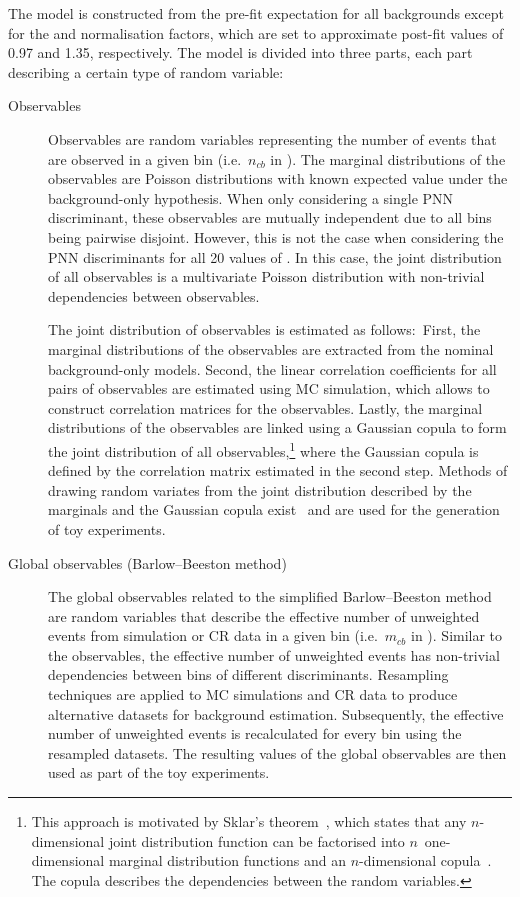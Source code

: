The model is constructed from the pre-fit expectation for all backgrounds except
for the \ttbar and \ZHF normalisation factors, which are set to approximate
post-fit values of 0.97 and 1.35, respectively. The model is divided into three
parts, each part describing a certain type of random variable:
\begin{description}

\item[Observables] Observables are random variables representing the number of
  events that are observed in a given bin (i.e.~$n_{cb}$ in
  ). The marginal distributions of the
  observables are Poisson distributions with known expected value under the
  background-only hypothesis. When only considering a single PNN discriminant,
  these observables are mutually independent due to all bins being pairwise
  disjoint. However, this is not the case when considering the PNN discriminants
  for all 20 values of \mX. In this case, the joint distribution of all
  observables is a multivariate Poisson distribution with non-trivial
  dependencies between observables.

  The joint distribution of observables is estimated as follows:~First, the
  marginal distributions of the observables are extracted from the nominal
  background-only models. Second, the linear correlation coefficients for all
  pairs of observables are estimated using MC simulation, which allows to
  construct correlation matrices for the observables. Lastly, the marginal
  distributions of the observables are linked using a Gaussian copula to form
  the joint distribution of all observables,\footnote{This approach is motivated
    by Sklar's theorem~\cite{Sklar1959FonctionsDR}, which states that any
    $n$-dimensional joint distribution function can be factorised into
    $n$~one-dimensional marginal distribution functions and an $n$-dimensional
    copula~\cite{nelsen}. The copula describes the dependencies between the
    random variables.} where the Gaussian copula is defined by the correlation
  matrix estimated in the second step. Methods of drawing random variates from
  the joint distribution described by the marginals and the Gaussian copula
  exist~\cite{nelsen} and are used for the generation of toy experiments.

\item[Global observables (Barlow--Beeston method)] The global observables
  related to the simplified Barlow--Beeston method are random variables that
  describe the effective number of unweighted events from simulation or CR data
  in a given bin (i.e.~$m_{cb}$ in
  ). Similar to the observables, the
  effective number of unweighted events has non-trivial dependencies between
  bins of different discriminants. Resampling techniques are applied to MC
  simulations and CR data to produce alternative datasets for background
  estimation. Subsequently, the effective number of unweighted events is
  recalculated for every bin using the resampled datasets. The resulting values
  of the global observables are then used as part of the toy experiments.


\end{description}

